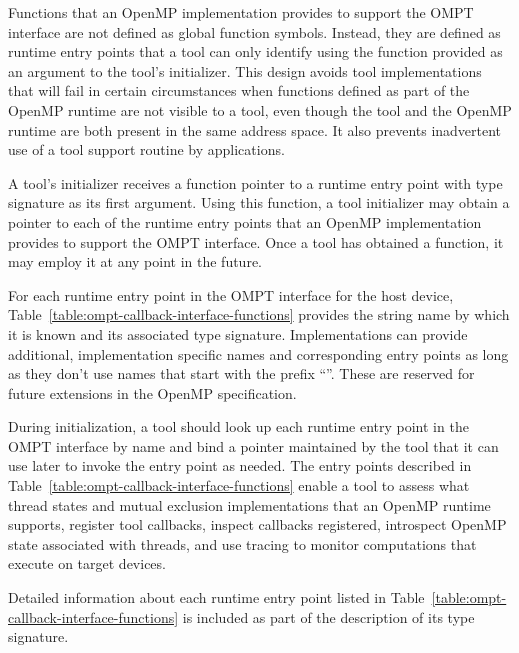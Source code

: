 \label{sec:ompt-bind}

Functions that an OpenMP implementation provides to support the OMPT interface
are not defined as global function symbols. Instead, they are defined as runtime entry points
that a tool can only identify using the  function provided as an
argument to the tool's initializer. This design avoids tool
implementations that
will fail in certain circumstances when functions defined as part of
the OpenMP runtime are not visible to a tool, even though the tool and
the OpenMP runtime are both present in the same address space.
It also prevents inadvertent use of a tool support routine by
applications.

A tool's initializer receives a function pointer to a 
runtime entry point with type signature
 as its first argument. Using this
function, a tool initializer may obtain a pointer to each of the
runtime entry points that an OpenMP implementation provides to support
the OMPT interface. Once a tool has obtained a
 function, it may employ it at any point in the future.

For each runtime entry point in the OMPT interface for the host device,
Table~\ref{table:ompt-callback-interface-functions} provides the string
name by which it is known and its associated type signature. Implementations
can provide additional, implementation specific names and corresponding
entry points as long as they don't use names that start with the prefix
``''. These are reserved for future extensions in the
OpenMP specification.

During initialization, a tool should look up each runtime entry point in the
OMPT interface by name and bind a pointer maintained by the tool
that it can use later to invoke the entry point as needed. The entry points
described in Table~\ref{table:ompt-callback-interface-functions}
enable a tool to assess
what thread states and mutual exclusion implementations that an OpenMP runtime supports,
register tool callbacks, inspect callbacks registered,
introspect OpenMP state associated with threads, and use tracing to monitor
computations that execute on target devices.

Detailed information about each runtime entry point listed in
Table~\ref{table:ompt-callback-interface-functions} is included as
part of the description of its type signature.

